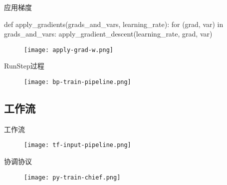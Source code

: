 \begin{frame}[fragile]{应用梯度}
  \begin{python} 
def apply_gradients(grads_and_vars, learning_rate):
  for (grad, var) in grads_and_vars:
    apply_gradient_descent(learning_rate, grad, var)
  \end{python}
  \begin{figure}
    \centering
    \texttt{[image: apply-grad-w.png]}
  \end{figure}  
\end{frame}

\begin{frame}{RunStep过程}
  \begin{figure}
    \centering
    \texttt{[image: bp-train-pipeline.png]}
  \end{figure}
\end{frame}

\subsection{工作流}

\begin{frame}{工作流}
  \begin{figure}
    \centering
    \texttt{[image: tf-input-pipeline.png]}
  \end{figure}
\end{frame}

\begin{frame}{协调协议}
  \begin{figure}
    \centering
    \texttt{[image: py-train-chief.png]}
  \end{figure}
\end{frame}
